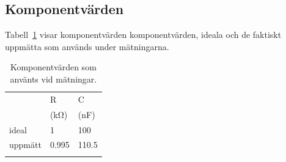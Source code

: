 \subsection{Komponentvärden}
Tabell~\ref{table-values} visar komponentvärden komponentvärden, ideala och
de faktiskt uppmätta som används under mätningarna.

\begin{table}[]
  \centering
  \begin{tabular}{@{}lll@{}}
  \toprule\addlinespace
          & R                & C                  \\
          & (\si{\kilo\ohm}) & (\si{\nano\farad}) \\ \midrule
  ideal   & 1                & 100                \\
  uppmätt & 0.995            & 110.5              \\
  \bottomrule
  \addlinespace
  \end{tabular}
  \caption[]{Komponentvärden som använts vid mätningar.}
  \label{table-values}
\end{table}

